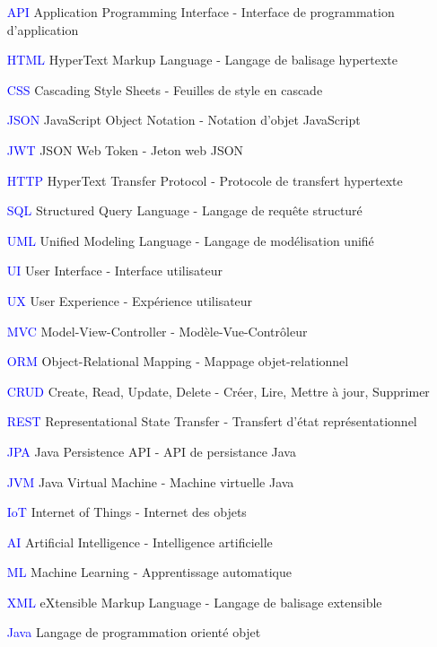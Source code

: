 \documentclass[12pt,a4paper,twoside,openright]{report}
\begin{document}
\begin{itemize}
\item[\textcolor{blue}{API}] Application Programming Interface - Interface de programmation d'application
\item[\textcolor{blue}{HTML}] HyperText Markup Language - Langage de balisage hypertexte
\item[\textcolor{blue}{CSS}] Cascading Style Sheets - Feuilles de style en cascade
\item[\textcolor{blue}{JSON}] JavaScript Object Notation - Notation d'objet JavaScript
\item[\textcolor{blue}{JWT}] JSON Web Token - Jeton web JSON
\item[\textcolor{blue}{HTTP}] HyperText Transfer Protocol - Protocole de transfert hypertexte
\item[\textcolor{blue}{SQL}] Structured Query Language - Langage de requête structuré
\item[\textcolor{blue}{UML}] Unified Modeling Language - Langage de modélisation unifié
\item[\textcolor{blue}{UI}] User Interface - Interface utilisateur
\item[\textcolor{blue}{UX}] User Experience - Expérience utilisateur
\item[\textcolor{blue}{MVC}] Model-View-Controller - Modèle-Vue-Contrôleur
\item[\textcolor{blue}{ORM}] Object-Relational Mapping - Mappage objet-relationnel
\item[\textcolor{blue}{CRUD}] Create, Read, Update, Delete - Créer, Lire, Mettre à jour, Supprimer
\item[\textcolor{blue}{REST}] Representational State Transfer - Transfert d'état représentationnel
\item[\textcolor{blue}{JPA}] Java Persistence API - API de persistance Java
\item[\textcolor{blue}{JVM}] Java Virtual Machine - Machine virtuelle Java
\item[\textcolor{blue}{IoT}] Internet of Things - Internet des objets
\item[\textcolor{blue}{AI}] Artificial Intelligence - Intelligence artificielle
\item[\textcolor{blue}{ML}] Machine Learning - Apprentissage automatique
\item[\textcolor{blue}{XML}] eXtensible Markup Language - Langage de balisage extensible
\item[\textcolor{blue}{Java}] Langage de programmation orienté objet
\end{itemize}
\end{document}
